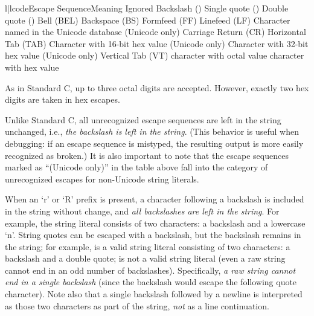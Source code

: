 \begin{tableii}{l|l}{code}{Escape Sequence}{Meaning}
 {Ignored}
\lineii{\e\e}	{Backslash (\code{\e})}
	{Single quote ()}
	{Double quote ()}
	{\ASCII{} Bell (BEL)}
	{\ASCII{} Backspace (BS)}
	{\ASCII{} Formfeed (FF)}
	{\ASCII{} Linefeed (LF)}
       {Character named  in the Unicode database (Unicode only)}
	{\ASCII{} Carriage Return (CR)}
	{\ASCII{} Horizontal Tab (TAB)}
       {Character with 16-bit hex value  (Unicode only)}
       {Character with 32-bit hex value  (Unicode only)}
	{\ASCII{} Vertical Tab (VT)}
 {\ASCII{} character with octal value }
 {\ASCII{} character with hex value }
\end{tableii}

As in Standard C, up to three octal digits are accepted.  However,
exactly two hex digits are taken in hex escapes.

Unlike Standard C,
all unrecognized escape sequences are left in the string unchanged,
i.e., \emph{the backslash is left in the string}.  (This behavior is
useful when debugging: if an escape sequence is mistyped, the
resulting output is more easily recognized as broken.)  It is also
important to note that the escape sequences marked as ``(Unicode
only)'' in the table above fall into the category of unrecognized
escapes for non-Unicode string literals.

When an `r' or `R' prefix is present, a character following a
backslash is included in the string without change, and \emph{all
backslashes are left in the string}.  For example, the string literal
 consists of two characters: a backslash and a lowercase
`n'.  String quotes can be escaped with a backslash, but the backslash
remains in the string; for example,  is a valid string
literal consisting of two characters: a backslash and a double quote;
 is not a valid string literal (even a raw string cannot
end in an odd number of backslashes).  Specifically, \emph{a raw
string cannot end in a single backslash} (since the backslash would
escape the following quote character).  Note also that a single
backslash followed by a newline is interpreted as those two characters
as part of the string, \emph{not} as a line continuation.


